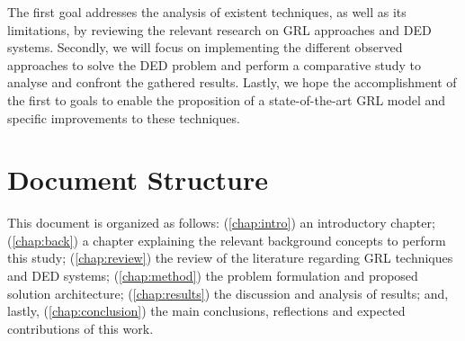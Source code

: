 The first goal addresses the analysis of existent techniques, as well as its limitations, by reviewing the relevant research on \ac{GRL} approaches and \ac{DED} systems. Secondly, we will focus on implementing the different observed approaches to solve the \ac{DED} problem and perform a comparative study to analyse and confront the gathered results. Lastly, we hope the accomplishment of the first to goals to enable the proposition of a state-of-the-art \ac{GRL} model and specific improvements to these techniques.



\section{Document Structure} \label{sec:intro-structure}

\begin{comment}
	TODO -> Update
\end{comment}
	

This document is organized as follows: (\ref{chap:intro}) an introductory chapter; (\ref{chap:back}) a chapter explaining the relevant background concepts to perform this study; (\ref{chap:review}) the review of the literature regarding \ac{GRL} techniques and \ac{DED} systems; (\ref{chap:method}) the problem formulation and proposed solution architecture; (\ref{chap:results}) the discussion and analysis of results; and, lastly, (\ref{chap:conclusion}) the main conclusions, reflections and expected contributions of this work.
